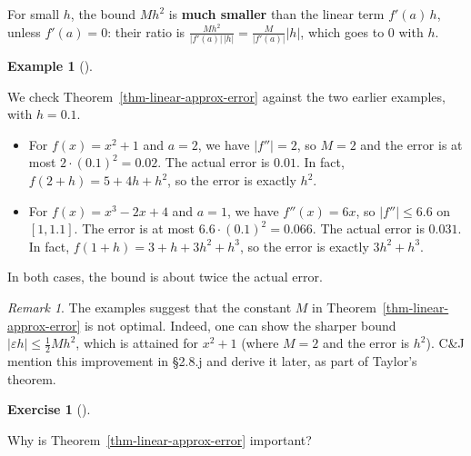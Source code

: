 \documentclass[
  letterpaper,
  DIV=11,
  numbers=noendperiod]{scrreprt}
\providecommand{\tightlist}{%
  \setlength{\itemsep}{0pt}\setlength{\parskip}{0pt}}
\theoremstyle{plain}
\theoremstyle{plain}
\theoremstyle{definition}
\theoremstyle{definition}
\newtheorem{exercise}{Exercise}[chapter]
\theoremstyle{definition}
\newtheorem{example}{Example}[chapter]
\theoremstyle{plain}
\theoremstyle{plain}
\theoremstyle{remark}
\newtheorem{refremark}{Remark}[chapter]
\begin{document}
For small \(h\), the bound \(M h^2\) is \textbf{much smaller} than the
linear term \(f'(a)\,h\), unless \(f'(a)=0\): their ratio is
\(\frac{M h^2}{\lvert f'(a) \rvert\,\lvert h \rvert} = \frac{M}{\lvert f'(a) \rvert}\lvert h \rvert\),
which goes to \(0\) with \(h\).

\begin{example}[]\protect\hypertarget{exm-error-bounds}{}\label{exm-error-bounds}

\hfill\break
We check Theorem~\ref{thm-linear-approx-error} against the two earlier
examples, with \(h=0.1\).

\begin{itemize}
\tightlist
\item
  For \(f(x)=x^2+1\) and \(a=2\), we have \(\lvert f'' \rvert=2\), so
  \(M=2\) and the error is at most \(2\cdot(0.1)^2 = 0.02\). The actual
  error is \(0.01\). In fact, \(f(2+h) = 5+4h+h^2\), so the error is
  exactly \(h^2\).
\item
  For \(f(x)=x^3-2x+4\) and \(a=1\), we have \(f''(x)=6x\), so
  \(\lvert f'' \rvert\le 6.6\) on \([1,1.1]\). The error is at most
  \(6.6\cdot(0.1)^2 = 0.066\). The actual error is \(0.031\). In fact,
  \(f(1+h) = 3 + h + 3h^2 + h^3\), so the error is exactly \(3h^2+h^3\).
\end{itemize}

In both cases, the bound is about twice the actual error.

\end{example}

\begin{refremark}
The examples suggest that the constant \(M\) in
Theorem~\ref{thm-linear-approx-error} is not optimal. Indeed, one can
show the sharper bound \(\lvert \varepsilon h \rvert\le \frac12 M h^2\),
which is attained for \(x^2+1\) (where \(M=2\) and the error is
\(h^2\)). C\&J mention this improvement in §2.8.j and derive it later,
as part of Taylor's theorem.

\label{rem-better-constant}

\end{refremark}

\begin{exercise}[]\protect\hypertarget{exr-why-important}{}\label{exr-why-important}

Why is Theorem~\ref{thm-linear-approx-error} important?

\end{exercise}
\end{document}
